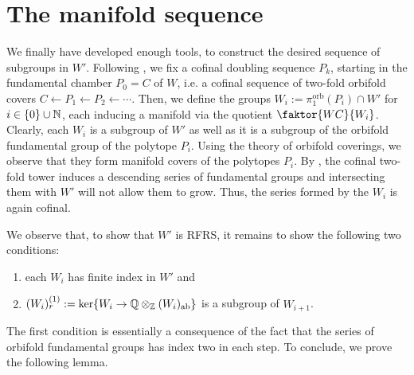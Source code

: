 
\newpage
\section{The manifold sequence}

We finally have developed enough tools, to construct the desired sequence of subgroups in \(W'\).
Following , we fix a cofinal doubling sequence \(P_k\), starting in the fundamental chamber \(P_0 = C\) of \(W\), i.e. a cofinal sequence of two-fold orbifold covers \(C \leftarrow P_1 \leftarrow P_2 \leftarrow \cdots\).
Then, we define the groups \(W_i := \pi_1^{\text{orb}}(P_i) \cap W'\) for \(i \in \{0\} \cup \mathbb{N}\), each inducing a manifold via the quotient \(\faktor{WC}{W_i}\).
Clearly, each \(W_i\) is a subgroup of \(W'\) as well as it is a subgroup of the orbifold fundamental group of the polytope \(P_i\).
Using the theory of orbifold coverings, we observe that they form manifold covers of the polytopes \(P_i\). %
By , the cofinal two-fold tower induces a descending series of fundamental groups and intersecting them with \(W'\) will not allow them to grow.
Thus, the series formed by the \(W_i\) is again cofinal.

\noindent
We observe that, to show that \(W'\) is RFRS, it remains to show the following two conditions:
\begin{enumerate}
    \item each \(W_i\) has finite index in \(W'\) and
    \item \((W_i)_r^{(1)} := \ker\{W_i \to \mathbb{Q} \otimes_{\mathbb{Z}} (W_i)_{\text{ab}}\}\) is a subgroup of \(W_{i+1}\).
\end{enumerate}
The first condition is essentially a consequence of the fact that the series of orbifold fundamental groups has index two in each step.
To conclude, we prove the following lemma.

